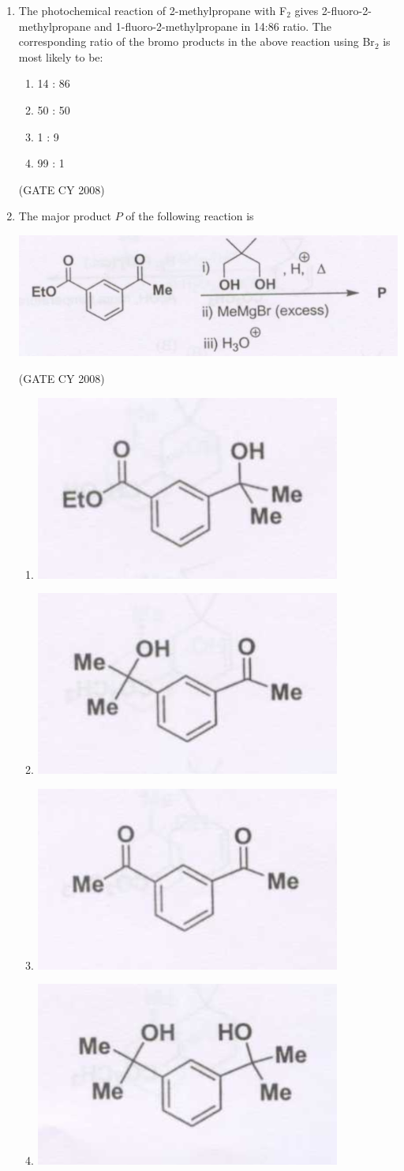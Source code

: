 \documentclass[12pt]{article}
\begin{document}
\begin{enumerate}
\item The photochemical reaction of 2-methylpropane with F$_2$ gives 2-fluoro-2-methylpropane and 1-fluoro-2-methylpropane in 14:86 ratio. The corresponding ratio of the bromo products in the above reaction using Br$_2$ is most likely to be:
\begin{enumerate}
\item 14 : 86
\item 50 : 50
\item 1 : 9
\item 99 : 1    
\end{enumerate}
\hfill{(GATE CY 2008)}


\item The major product $P$ of the following reaction is

\begin{center}
\includegraphics[width=0.6\columnwidth]{figs/q44.png}
\end{center}    \hfill{(GATE CY 2008)}
\begin{enumerate}
    \item \includegraphics[width=0.2\columnwidth]{figs/q44 a.png}
    \item \includegraphics[width=0.2\columnwidth]{figs/q44 b.png}
    \item \includegraphics[width=0.2\columnwidth]{figs/q44 c.png}
    \item \includegraphics[width=0.2\columnwidth]{figs/q44 d.png}
\end{enumerate}



\end{enumerate}
\end{document}
